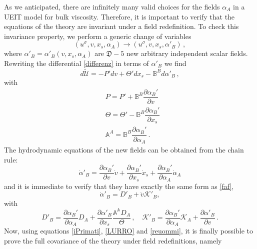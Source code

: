 \documentclass[a4paper, amsfonts, amssymb, amsmath, reprint, twocolumn, showkeys, nofootinbib]{revtex4-2}
\begin{document}
As we anticipated, there are infinitely many valid choices for the fields $\alpha_A$ in a UEIT model for bulk viscosity. Therefore, it is important to verify that the equations of the theory are invariant under a field redefinition. 
To check this invariance property, we perform a generic change of variables
\begin{equation}\label{fieldrefegrf}
(u^\sigma,v, x_s, \alpha_A) \longrightarrow (u^\sigma,v, x_s, \alpha'_B) \, ,
\end{equation}
where $\alpha'_B = \alpha'_B (v,x_s,\alpha_A)$ are $\mathfrak{D}-5$ new arbitrary independent scalar fields. Rewriting the differential \eqref{differenz} in terms of $\alpha'_B$ we find
\begin{equation}
d\tilde{\mathcal{U}} =-P' dv + \Theta' dx_s -\mathbb{B}^B d\alpha'_B \, , 
\end{equation} 
with
\begin{equation}\label{iPrimati}
 \begin{split}
& P=P'+ \mathbb{B}^B \dfrac{\partial \alpha_B'}{\partial v}  
 \\
& \Theta = \Theta' - \mathbb{B}^B \dfrac{\partial \alpha_B'}{\partial x_s} 
 \\  
 & \mathbb{A}^A = \mathbb{B}^B \dfrac{\partial \alpha_B'}{\partial \alpha_A} \, .  
\end{split}
\end{equation}
The hydrodynamic equations of the new fields can be obtained from the chain rule:
\begin{equation}
\dot{\alpha}'_B = \dfrac{\partial \alpha_B'}{\partial v} \dot{v} + \dfrac{\partial \alpha_B'}{\partial x_s} \dot{x}_s + \dfrac{\partial \alpha_B'}{\partial \alpha_A} \dot{\alpha}_A  
\end{equation}
and it is immediate to verify that they have exactly the same form as \eqref{faf},
\begin{equation}\label{dprim}
\dot{\alpha}'_B = D'_B + \dot{v} \mathcal{K}'_B,
\end{equation}
with
\begin{equation}\label{reuommi}
 D'_B = \dfrac{\partial \alpha_B'}{\partial \alpha_A} D_A + \dfrac{\partial \alpha'_B}{\partial x_s} \dfrac{\mathbb{A^A }D_A}{\Theta} \, ,
 \quad  
 \mathcal{K}'_B = \dfrac{\partial \alpha_B'}{\partial \alpha_A} \mathcal{K}_A + \dfrac{\partial \alpha'_B}{\partial v} \, .
\end{equation}
Now, using equations \eqref{iPrimati}, \eqref{LURRO} and \eqref{reuommi}, it is finally possible to prove the full covariance of the theory under field redefinitions, namely
\end{document}
